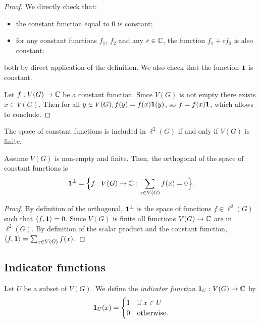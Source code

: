 \begin{proof}
  We directly check that:
  \begin{itemize}
    \item the constant function equal to $0$ is constant;
    \item for any constant functions $f_1$, $f_2$ and any $c \in \mathbb{C}$,
    the function $f_1+cf_2$ is also constant;
  \end{itemize}
  both by direct application of the definition.
  We also check that the function $\mathbf{1}$ is constant.

  Let $f : V(G) \rightarrow \mathbb{C}$ be a constant function. Since $V(G)$ is not
  empty there exists $x \in V(G)$. Then for all $y \in V(G), f(y) = f(x) \mathbf{1}(y)$,
  so $f = f(x) \mathbf{1}$, which allows to conclude.
\end{proof}

\begin{lemma}
  \label{lem:constant_is_l2}
  The space of constant functions is included in $\ell^2(G)$
  if and only if $V(G)$ is finite.
\end{lemma}

\begin{lemma}
  \label{lem:orth_constant}
  Assume $V(G)$ is non-empty and finite.
  Then, the orthogonal of the space of constant functions is
  \begin{equation*}
    \mathbf{1}^\perp = \Big\{ f : V(G) \rightarrow \mathbb{C} :
    \sum_{x \in V(G)}f(x)=0 \Big\}.
  \end{equation*}
\end{lemma}

\begin{proof}
  By definition of the orthogonal, $\mathbf{1}^\perp$ is the space of functions $f \in \ell^2(G)$
  such that $\langle f, \mathbf{1} \rangle = 0$.
  Since $V(G)$ is finite all functions $V(G) \rightarrow \mathbb{C}$ are in $\ell^2(G)$.
  By definition of the scalar product and the constant function,
  $\langle f, \mathbf{1} \rangle = \sum_{x \in V(G)}f(x)$.
\end{proof}

\subsection{Indicator functions}

\begin{definition}
  \label{def:indicator_function}
  Let $U$ be a subset of $V(G)$. We define the \emph{indicator function}
  $\mathbf{1}_U : V(G) \rightarrow \mathbb{C}$ by
  \begin{equation}
    \mathbf{1}_U (x) =
    \begin{cases}
      1 & \text{if } x \in U \\
      0 & \text{otherwise}.
    \end{cases}
  \end{equation}
\end{definition}

